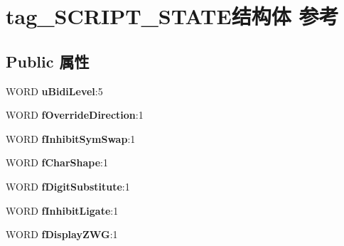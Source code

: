 \hypertarget{structtag___s_c_r_i_p_t___s_t_a_t_e}{}\section{tag\+\_\+\+S\+C\+R\+I\+P\+T\+\_\+\+S\+T\+A\+T\+E结构体 参考}
\label{structtag___s_c_r_i_p_t___s_t_a_t_e}
\subsection*{Public 属性}
\begin{DoxyCompactItemize}
\item 
\mbox{\label{structtag___s_c_r_i_p_t___s_t_a_t_e_a5022ef01fdfae468605b1bf189974e2f}} 
W\+O\+RD {\bfseries u\+Bidi\+Level}\+:5
\item 
\mbox{\label{structtag___s_c_r_i_p_t___s_t_a_t_e_a16f140ad705abc84c077bf44e06b5ac2}} 
W\+O\+RD {\bfseries f\+Override\+Direction}\+:1
\item 
\mbox{\label{structtag___s_c_r_i_p_t___s_t_a_t_e_ae701f767d160fff58237532ce84f7cc7}} 
W\+O\+RD {\bfseries f\+Inhibit\+Sym\+Swap}\+:1
\item 
\mbox{\label{structtag___s_c_r_i_p_t___s_t_a_t_e_a12dcb5e8961363feeed55107f00a00ed}} 
W\+O\+RD {\bfseries f\+Char\+Shape}\+:1
\item 
\mbox{\label{structtag___s_c_r_i_p_t___s_t_a_t_e_a76bd1ebb5514e6853a46ecf18c2072f3}} 
W\+O\+RD {\bfseries f\+Digit\+Substitute}\+:1
\item 
\mbox{\label{structtag___s_c_r_i_p_t___s_t_a_t_e_ab13e82c5ec8fa7238f1b25eb2fbc43e2}} 
W\+O\+RD {\bfseries f\+Inhibit\+Ligate}\+:1
\item 
\mbox{\label{structtag___s_c_r_i_p_t___s_t_a_t_e_a9055b7ee36c5d053f8e6d3672603b8d3}} 
W\+O\+RD {\bfseries f\+Display\+Z\+WG}\+:1
\item 
\mbox{\label{structtag___s_c_r_i_p_t___s_t_a_t_e_a7e19db6a0bda4dbc5b67b59a48b34114}} 

\end{DoxyCompactItemize}
